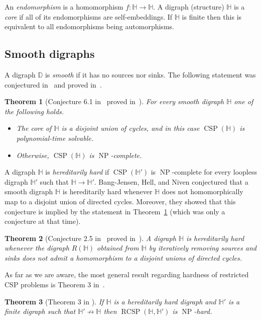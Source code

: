 \documentclass{article}
\newtheorem{theorem}{Theorem}
\theoremstyle{definition}
\theoremstyle{remark}
\DeclareMathOperator{\NP}{NP}
\DeclareMathOperator{\CSP}{CSP}
\DeclareMathOperator{\RCSP}{RCSP}
\newcommand{\bD}{{\mathbb D}}
\newcommand{\bH}{{\mathbb H}}
\begin{document}
An \emph{endomorphism} is a homomorphism $f\colon \bH\to \bH$. A digraph (structure) $\bH$ is a \emph{core}
if all of its endomorphisms are self-embeddings. If $\bH$ is finite then this is equivalent to all endomorphisms being automorphisms.

\subsection{Smooth digraphs}

A digraph $\bD$ is \emph{smooth} if it has no sources nor sinks. 
The following statement was conjectured in~\cite{bangjensenDAM26}
and proved in~\cite{BartoKozikNiven}.

\begin{theorem}[Conjecture 6.1 in~\cite{bangjensenDAM26} proved in~\cite{BartoKozikNiven}]
\label{thm:smooth}
    For every smooth digraph $\bH$ one of the following holds.
    \begin{itemize}
        \item The core of $\bH$ is a disjoint union of cycles, and in this case $\CSP(\bH)$ is
        polynomial-time solvable.
        \item Otherwise, $\CSP(\bH)$ is $\NP$-complete.
    \end{itemize}
\end{theorem}

A digraph $\bH$ is \emph{hereditarily hard} if $\CSP(\bH')$ is $\NP$-complete for every loopless digraph $\bH'$
such that $\bH\to \bH'$. Bang-Jensen, Hell, and Niven conjectured that a smooth digraph
$\bH$ is hereditarily hard whenever $\bH$ does not homomorphically map to a disjoint union of directed cycles.
Moreover, they showed that this conjecture is implied by the statement in Theorem~\ref{thm:smooth} (which was
only a conjecture at that time). 

\begin{theorem}
[Conjecture 2.5 in~\cite{bangjensenDM138} proved in~\cite{BartoKozikNiven}]
\label{thm:smooth-hereditay}
    A digraph $\bH$ is hereditarily hard whenever the digraph $R(\bH)$ obtained from $\bH$ by iteratively
    removing sources and sinks does not admit a homomorphism to a disjoint unions of directed
    cycles.
\end{theorem}

As far as we are aware, the most general result regarding hardness of restricted CSP problems
is Theorem 3 in~\cite{brewsterDAM156}.

\begin{theorem}
[Theorem 3 in \cite{brewsterDAM156}]
\label{thm:brewster}
    If $\bH$ is a hereditarily hard digraph and $\bH'$ is a finite digraph such that $\bH'\not\to \bH$
    then $\RCSP(\bH,\bH')$ is $\NP$-hard.
\end{theorem}
\end{document}
